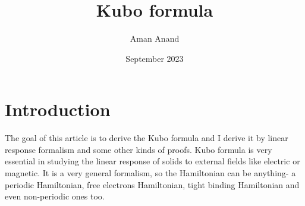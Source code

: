 \documentclass{article}
\title{Kubo formula}
\author{Aman Anand}
\date{September 2023}
\begin{document}
	
	\maketitle
	
	\section{Introduction}

	The goal of this article is to derive the Kubo formula and I derive it by linear response formalism and some other kinds of proofs. Kubo formula is very essential in studying the linear response of solids to external fields like electric or magnetic. It is a very general formalism, so the Hamiltonian can be anything- a periodic Hamiltonian, free electrons Hamiltonian, tight binding Hamiltonian and even non-periodic ones too.
	
	
	
	
	
	
\end{document}
